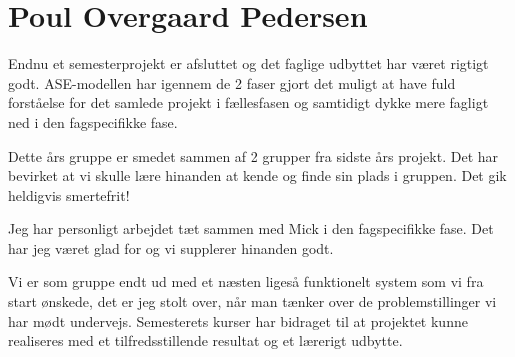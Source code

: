 \section{Poul Overgaard Pedersen}

Endnu et semesterprojekt er afsluttet og det faglige udbyttet har været rigtigt godt. ASE-modellen har igennem de 2 faser gjort det muligt at have fuld forståelse for det samlede projekt i fællesfasen og samtidigt dykke mere fagligt ned i den fagspecifikke fase. 

Dette års gruppe er smedet sammen af 2 grupper fra sidste års projekt. Det har bevirket at vi skulle lære hinanden at kende og finde sin plads i gruppen. Det gik heldigvis smertefrit! 

Jeg har personligt arbejdet tæt sammen med Mick i den fagspecifikke fase. Det har jeg været glad for og vi supplerer hinanden godt. 

Vi er som gruppe endt ud med et næsten ligeså funktionelt system som vi fra start ønskede, det er jeg stolt over, når man tænker over de problemstillinger vi har mødt undervejs. Semesterets kurser har bidraget til at projektet kunne realiseres med et tilfredsstillende resultat og et lærerigt udbytte. 